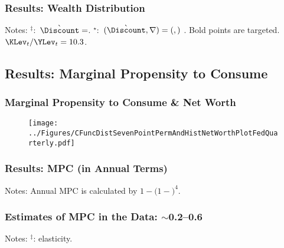 \begin{frame}
\frametitle{{Results: Wealth Distribution}}

\begin{table}
\begin{footnotesize}



\end{footnotesize}
\end{table}
\tiny{Notes: $^{\ddagger}:$ $\grave{\Discount}=

$.
$^{\star}:$ $(\grave{\Discount}, \nabla)=(

,

)$%
.
Bold points are targeted. $\KLev_{t}/\YLev_{t}=10.3$. }
\end{frame}

\subsection{Results: Marginal Propensity to Consume}

\begin{frame}
\frametitle{{Marginal Propensity to Consume \& Net Worth}}

\begin{figure}
\centering
\texttt{[image: ../Figures/CFuncDistSevenPointPermAndHistNetWorthPlotFedQuarterly.pdf]}
\end{figure}

\end{frame}

\begin{frame}
\frametitle{{Results: MPC (in Annual Terms)}}
\begin{scriptsize}
\begin{table}

\end{table}
\tiny{Notes: Annual MPC is calculated by $1-(1-$$)^{4}$.
}
\end{scriptsize}
\end{frame}

\begin{frame}
\frametitle{{Estimates of MPC in the Data: $\boldsymbol{\sim}$0.2--0.6}}

\begin{tiny}

\tiny{Notes: $^{\ddagger}$: elasticity.}
\end{tiny}

\end{frame}



